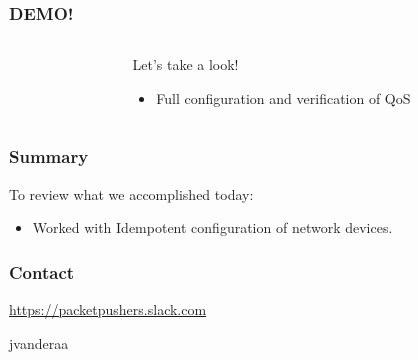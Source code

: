 \documentclass[aspectratio=169]{beamer}
\begin{document}
  \begin{frame}
    \frametitle{DEMO!}
    \begin{columns}
    \begin{column}{0.3\textwidth}
      \Huge
      \begin{center}
        \faDesktop 
        \hspace{.5cm}
        \faRocket     
      \end{center}
    \end{column}
    \begin{column}{0.7\textwidth}
      \huge 
        Let's take a look!
        \begin{itemize}
          \item Full configuration and verification of QoS
        \end{itemize}
    \end{column}
    \end{columns}
  \end{frame}

  \begin{frame}
    \frametitle{Summary}
      To review what we accomplished today:
      \begin{itemize}
        \item <2-> Worked with Idempotent configuration of network devices.
      \end{itemize}
  \end{frame}

  \begin{frame}
    \frametitle{Contact}
    \huge
    \begin{center}
      \url{https://packetpushers.slack.com}
    \end{center}
    \begin{center}
      \normalsize
      \faSlack \hspace{.1cm}jvanderaa  
    \end{center}
  \end{frame}
\end{document}
